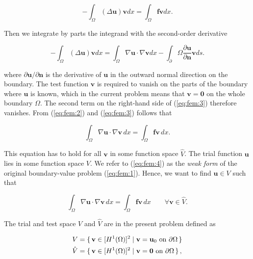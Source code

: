\documentclass[a4paper,11pt,openright,twoside]{book}
\begin{document}
\begin{equation}
\label{eq:fem:2}
- \int_\Omega (\Delta \mathbf{u}) \mathbf{v} dx = \int_\Omega \mathbf{f} \mathbf{v} dx.
\end{equation}

Then we integrate by parts the integrand with the second-order derivative

\begin{equation}
\label{eq:fem:3}
- \int_\Omega (\Delta \mathbf{u}) \mathbf{v} dx =
\int_\Omega \nabla \mathbf{u} \cdot \nabla \mathbf{v} dx
- \int_\partial \Omega \frac{\partial \mathbf{u}}{\partial \mathbf{n}} \mathbf{v} ds.
\end{equation}

where $\partial \mathbf{u}/\partial \mathbf{n}$ is the derivative of $\mathbf{u}$ in the outward normal direction on the boundary. The test function $\mathbf{v}$ is required to vanish on the parts of the boundary where $\mathbf{u}$ is known, which in the current problem means that $\mathbf{v} = \mathbf{0}$ on the whole boundary $\Omega$. The second term on the right-hand side of (\ref{eq:fem:3}) therefore vanishes. From (\ref{eq:fem:2}) and (\ref{eq:fem:3}) follows that

\begin{equation}
\label{eq:fem:4}
\int_\Omega \nabla \mathbf{u} \cdot \nabla \mathbf{v} \, dx = \int_\Omega \mathbf{f} \mathbf{v} \, dx. 
\end{equation}

This equation has to hold for all $\mathbf{v}$ in some function space $\hat{V}$. The trial function $\mathbf{u}$ lies in some function space $V$. We refer to (\ref{eq:fem:4}) as the \emph{weak form} of the original boundary-value problem (\ref{eq:fem:1}).
Hence, we want to find $\mathbf{u} \in V$ such that

\begin{equation}
\label{eq:fem:5}
\int_\Omega \nabla \mathbf{u} \cdot \nabla \mathbf{v} \, dx = \int_\Omega \mathbf{f} \mathbf{v} \, dx \qquad \forall \mathbf{v} \in \hat{V}.
\end{equation}

The trial and test space $V$ and $\hat{V}$ are in the present problem defined as

\begin{align}
V &= \set{\mathbf{v} \in [H^1(\Omega)]^2 | \mathbf{v} = \mathbf{u}_0 \text{ on } \partial \Omega}  \\
\hat{V} &= \set{\mathbf{v} \in [H^1(\Omega)]^2 | \mathbf{v} = \mathbf{0} \text{ on } \partial \Omega}, 
\end{align}
\end{document}
